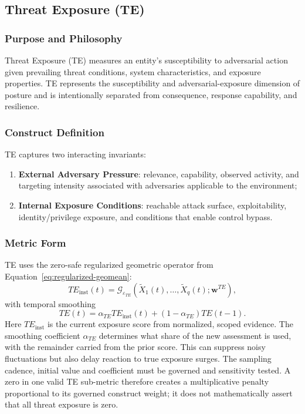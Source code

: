 \documentclass[11pt]{article}
\begin{document}
\subsection{Threat Exposure (TE)}
\subsubsection{Purpose and Philosophy}
Threat Exposure (TE) measures an entity's susceptibility to adversarial action given
prevailing threat conditions, system characteristics, and exposure properties. TE
represents the susceptibility and adversarial-exposure dimension of posture and is intentionally
separated from consequence, response capability, and resilience.

\subsubsection{Construct Definition}
TE captures two interacting invariants:
\begin{enumerate}
  \item \textbf{External Adversary Pressure}: relevance, capability, observed activity,
    and targeting intensity associated with adversaries applicable to the environment;
  \item \textbf{Internal Exposure Conditions}: reachable attack surface,
    exploitability, identity/privilege exposure, and conditions that enable control
    bypass.
\end{enumerate}

\subsubsection{Metric Form}
TE uses the zero-safe regularized geometric operator from
Equation~\ref{eq:regularized-geomean}:
\begin{equation}
  TE_{\mathrm{inst}}(t)=
  \mathcal{G}_{\varepsilon_{TE}}
  \left(\widetilde{X}_1(t),\ldots,\widetilde{X}_q(t);\mathbf{w}^{TE}\right),
  \label{eq:te-inst}
\end{equation}
with temporal smoothing
\begin{equation}
  TE(t)=\alpha_{TE}TE_{\mathrm{inst}}(t)
       +(1-\alpha_{TE})TE(t-1).
  \label{eq:te-smooth}
\end{equation}
Here $TE_{\mathrm{inst}}$ is the current exposure score from normalized,
scoped evidence. The smoothing coefficient $\alpha_{TE}$ determines
what share of the new assessment is used, with the remainder carried
from the prior score. This can suppress noisy fluctuations but also
delay reaction to true exposure surges. The sampling cadence,
initial value and coefficient must be governed and sensitivity tested.
A zero in one valid TE sub-metric therefore creates a multiplicative penalty
proportional to its governed construct weight; it does not mathematically assert that
all threat exposure is zero.
\end{document}
